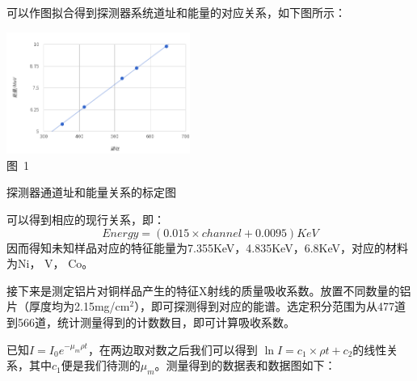 \documentclass[a4paper,10.0pt,twoside]{npr}
\begin{document}
\begin{multicols}{2}
可以作图拟合得到探测器系统道址和能量的对应关系，如下图所示：
\begin{center}
   \includegraphics[width=0.45\textwidth]{1.png}
\\
\xiaowu\song 图~1\begin{minipage}[t]{75mm} \quad 探测器通道址和能量关系的标定图\\[-1mm]\wuhao
\end{minipage}
\end{center}
可以得到相应的现行关系，即：
\begin{equation}
   Energy = (0.015 \times channel + 0.0095)KeV
\end{equation}
因而得知未知样品对应的特征能量为7.355KeV，4.835KeV，6.8KeV，对应的材料为Ni， V， Co。

接下来是测定铝片对铜样品产生的特征X射线的质量吸收系数。放置不同数量的铝片（厚度均为2.15mg/cm$^2$），即可探测得到对应的能谱。选定积分范围为从477道到566道，统计测量得到的计数数目，即可计算吸收系数。 

已知$I=I_0e^{-\mu_m\rho t}$，在两边取对数之后我们可以得到 $\ln{I} = c_1 \times \rho t
+ c_2$的线性关系，其中$c_1$便是我们待测的$\mu_m$。测量得到的数据表和数据图如下：


\end{multicols}
\end{document}
